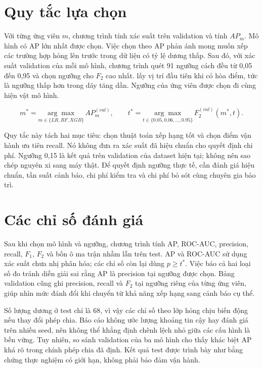 \section{Quy tắc lựa chọn}
Với từng ứng viên $m$, chương trình tính xác suất trên validation và tính $AP_m$. Mô hình có AP lớn nhất được chọn. Việc chọn theo AP phản ánh mong muốn xếp các trường hợp hỏng lên trước trong dữ liệu có tỷ lệ dương thấp. Sau đó, với xác suất validation của mỗi mô hình, chương trình quét 91 ngưỡng cách đều từ 0,05 đến 0,95 và chọn ngưỡng cho $F_2$ cao nhất.  lấy vị trí đầu tiên khi có hòa điểm, tức là ngưỡng thấp hơn trong dãy tăng dần. Ngưỡng của ứng viên được chọn đi cùng hiện vật mô hình.

\begin{equation}
m^*=\underset{m\in\{LR,RF,XGB\}}{\arg\max}\,AP_m^{(val)},\qquad
t^*=\underset{t\in\{0.05,0.06,\ldots,0.95\}}{\arg\max}\,F_2^{(val)}(m^*,t).
\end{equation}

Quy tắc này tách hai mục tiêu: chọn thuật toán xếp hạng tốt và chọn điểm vận hành ưu tiên recall. Nó không đưa ra xác suất đã hiệu chuẩn cho quyết định chi phí. Ngưỡng 0,15 là kết quả trên validation của dataset hiện tại; không nên sao chép nguyên xi sang máy thật. Để quyết định ngưỡng thực tế, cần đánh giá hiệu chuẩn, tần suất cảnh báo, chi phí kiểm tra và chi phí bỏ sót cùng chuyên gia bảo trì.

\section{Các chỉ số đánh giá}
Sau khi chọn mô hình và ngưỡng, chương trình tính AP, ROC-AUC, precision, recall, $F_1$, $F_2$ và bốn ô ma trận nhầm lẫn trên test. AP và ROC-AUC sử dụng xác suất chưa nhị phân hóa; các chỉ số còn lại dùng $p\geq t^*$. Việc báo cả hai loại số đo tránh diễn giải sai rằng AP là precision tại ngưỡng được chọn. Bảng validation cũng ghi precision, recall và $F_2$ tại ngưỡng riêng của từng ứng viên, giúp nhìn mức đánh đổi khi chuyển từ khả năng xếp hạng sang cảnh báo cụ thể.

Số lượng dương ở test chỉ là 68, vì vậy các chỉ số theo lớp hỏng chịu biến động nếu thay đổi phép chia. Báo cáo không ước lượng khoảng tin cậy hay đánh giá trên nhiều seed, nên không thể khẳng định chênh lệch nhỏ giữa các cấu hình là bền vững. Tuy nhiên, so sánh validation của ba mô hình cho thấy khác biệt AP khá rõ trong chính phép chia đã định. Kết quả test được trình bày như bằng chứng thực nghiệm có giới hạn, không phải bảo đảm vận hành.

